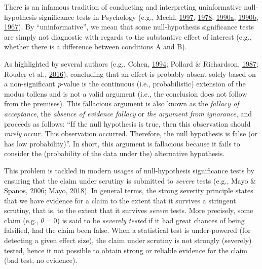 \documentclass[
  english,
  man, donotrepeattitle,floatsintext]{apa6}
\begin{document}
There is an infamous tradition of conducting and interpreting uninformative null-hypothesis significance tests in Psychology (e.g., Meehl, \protect\hyperlink{ref-harlow_problem_1997}{1997}, \protect\hyperlink{ref-meehl_theoretical_1978}{1978}, \protect\hyperlink{ref-meehl_why_1990}{1990}\protect\hyperlink{ref-meehl_why_1990}{a}, \protect\hyperlink{ref-meehl_appraising_1990-1}{1990}\protect\hyperlink{ref-meehl_appraising_1990-1}{b}, \protect\hyperlink{ref-meehl_theory-testing_1967}{1967}). By ``uninformative'', we mean that some null-hypothesis significance tests are simply not diagnostic with regards to the substantive effect of interest (e.g., whether there is a difference between conditions A and B).

As highlighted by several authors (e.g., Cohen, \protect\hyperlink{ref-cohen_earth_1994}{1994}; Pollard \& Richardson, \protect\hyperlink{ref-pollard_probability_1987}{1987}; Rouder et al., \protect\hyperlink{ref-rouder_is_2016}{2016}), concluding that an effect is probably absent solely based on a non-significant \emph{p}-value is the continuous (i.e., probabilistic) extension of the modus tollens and is not a valid argument (i.e., the conclusion does not follow from the premises). This fallacious argument is also known as the \emph{fallacy of acceptance}, the \emph{absence of evidence fallacy} or \emph{the argument from ignorance}, and proceeds as follows: ``If the null hypothesis is true, then this observation should \emph{rarely} occur. This observation occurred. Therefore, the null hypothesis is false (or has low probability)''. In short, this argument is fallacious because it fails to consider the (probability of the data under the) alternative hypothesis.

This problem is tackled in modern usages of null-hypothesis significance tests by ensuring that the claim under scrutiny is submitted to \emph{severe} tests (e.g., Mayo \& Spanos, \protect\hyperlink{ref-mayo_severe_2006}{2006}; Mayo, \protect\hyperlink{ref-mayo_statistical_2018}{2018}). In general terms, the strong severity principle states that we have evidence for a claim to the extent that it survives a stringent scrutiny, that is, to the extent that it survives \emph{severe} tests. More precisely, some claim (e.g., \(\theta = 0\)) is said to be \emph{severely tested} if it had great chances of being falsified, had the claim been false. When a statistical test is under-powered (for detecting a given effect size), the claim under scrutiny is not strongly (severely) tested, hence it not possible to obtain strong or reliable evidence for the claim (bad test, no evidence).
\end{document}
